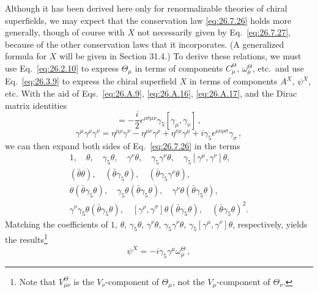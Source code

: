 Although it has been derived here only for renormalizable theories of chiral
superfields, we may expect that the conservation law \eqref{eq:26.7.26}
holds more generally, though of course with \(X\) not necessarily given by
Eq.~\eqref{eq:26.7.27}, because of the other conservation laws that it
incorporates. (A generalized formula for \(X\) will be given in Section
31.4.) To derive these relations, we must use Eq.~\eqref{eq:26.2.10} to
express \(\Theta_\mu\) in terms of components \(C_\mu^\Theta\),
\(\omega_\mu^\Theta\), etc.\ and use Eq.~\eqref{eq:26.3.9} to express the
chiral superfield \(X\) in terms of components \(A^X\), \(\psi^X\), etc.
With the aid of Eqs.~\eqref{eq:26.A.9}, \eqref{eq:26.A.16},
\eqref{eq:26.A.17}, and the Dirac matrix identities
\begin{equation}
  [\gamma^\rho,\gamma^\sigma]
  =-\frac{i}{2}\epsilon^{\rho\sigma\mu\nu}\gamma_5
   [\gamma_\mu,\gamma_\nu]\,,
  \tag{26.7.28}\label{eq:26.7.28}
\end{equation}
\begin{equation}
  \gamma^\mu\gamma^\rho\gamma^\nu
  =\eta^{\mu\rho}\gamma^\nu
   -\eta^{\mu\nu}\gamma^\rho
   +\eta^{\nu\rho}\gamma^\mu
   +i\gamma_5\epsilon^{\mu\nu\rho\sigma}\gamma_\sigma\,,
  \tag{26.7.29}\label{eq:26.7.29}
\end{equation}
we can then expand both sides of Eq.~\eqref{eq:26.7.26} in the terms
\[
  \begin{gathered}
  1,\quad \theta,\quad \gamma_5\theta,\quad \gamma^\nu\theta,\quad
  \gamma_5\gamma^\nu\theta,\quad
  \gamma_5[\gamma^\mu,\gamma^\nu]\theta,\\
  (\bar\theta\theta),\quad
  (\bar\theta\gamma_5\theta),\quad
  (\bar\theta\gamma_5\gamma^\nu\theta),\\
  \theta(\bar\theta\gamma_5\theta),\quad
  \gamma_5\theta(\bar\theta\gamma_5\theta),\quad
  \gamma^\nu\theta(\bar\theta\gamma_5\theta),\\
  \gamma^\nu\gamma_5\theta(\bar\theta\gamma_5\theta),\quad
  [\gamma^\rho,\gamma^\sigma]\theta
    (\bar\theta\gamma_5\theta),\quad
  (\bar\theta\gamma_5\theta)^2 .
  \end{gathered}
\]
Matching the coefficients of \(1\), \(\theta\), \(\gamma_5\theta\),
\(\gamma^\nu\theta\), \(\gamma_5\gamma^\nu\theta\),
\(\gamma_5[\gamma^\mu,\gamma^\nu]\theta\), respectively, yields the
results\footnote{Note that \(V_{\mu\nu}^\Theta\) is the
\(V_\nu\)-component of \(\Theta_\mu\), not the \(V_\mu\)-component of
\(\Theta_\nu\).}
\begin{equation}
  \psi^X=-i\gamma_5\gamma^\mu\omega_\mu^\Theta\,,
  \tag{26.7.30}\label{eq:26.7.30}
\end{equation}
